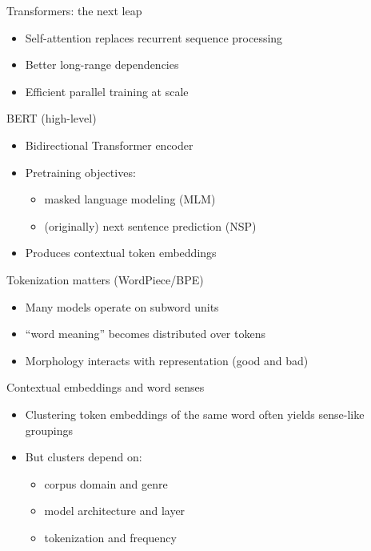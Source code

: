 \documentclass{beamer}
\begin{document}
\begin{frame}{Transformers: the next leap}
\begin{itemize}
  \item Self-attention replaces recurrent sequence processing
  \item Better long-range dependencies
  \item Efficient parallel training at scale
\end{itemize}
\end{frame}

\begin{frame}{BERT (high-level)}
\begin{itemize}
  \item Bidirectional Transformer encoder
  \item Pretraining objectives:
  \begin{itemize}
    \item masked language modeling (MLM)
    \item (originally) next sentence prediction (NSP)
  \end{itemize}
  \item Produces contextual token embeddings
\end{itemize}
\end{frame}

\begin{frame}{Tokenization matters (WordPiece/BPE)}
\begin{itemize}
  \item Many models operate on subword units
  \item ``word meaning'' becomes distributed over tokens
  \item Morphology interacts with representation (good and bad)
\end{itemize}
\end{frame}

\begin{frame}{Contextual embeddings and word senses}
\begin{itemize}
  \item Clustering token embeddings of the same word often yields sense-like groupings
  \item But clusters depend on:
  \begin{itemize}
    \item corpus domain and genre
    \item model architecture and layer
    \item tokenization and frequency
  \end{itemize}
\end{itemize}
\end{frame}
\end{document}
